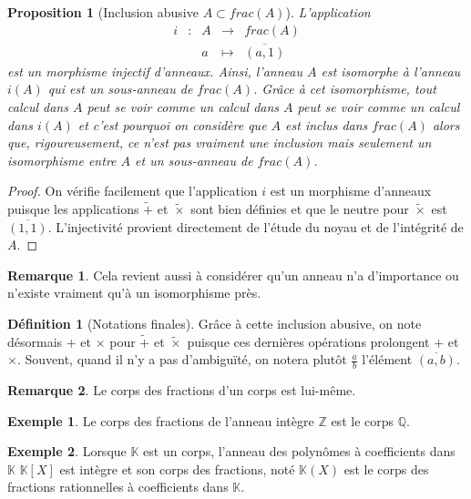 \documentclass[french]{book}
\newcommand{\Z}{\mathbb{Z}}
\newcommand{\Q}{\mathbb{Q}}
\newcommand{\K}{\mathbb{K}}
\theoremstyle{plain}
\newtheorem{prop}{Proposition}[chapter]
\theoremstyle{definition}
\newtheorem{dfn}{Définition}[chapter]
\newtheorem{exa}{Exemple}[chapter]
\newtheorem{rmq}{Remarque}[chapter]
\theoremstyle{remark}
\begin{document}
\begin{prop}[Inclusion abusive $A\subset frac(A)$]
	L'application $$\begin{array}{ccccc}i&:&A&\longrightarrow&frac(A)\\&&a&\longmapsto&\overline{(a,1)}\end{array}$$ est un morphisme injectif d'anneaux. Ainsi, l'anneau $A$ est isomorphe à l'anneau $i(A)$ qui est un sous-anneau de $frac(A)$. Grâce à cet isomorphisme, tout calcul dans $A$ peut se voir comme un calcul dans $A$ peut se voir comme un calcul dans $i(A)$ et c'est pourquoi on considère que $A$ est inclus dans $frac(A)$ alors que, rigoureusement, ce n'est pas vraiment une inclusion mais seulement un isomorphisme entre $A$ et un sous-anneau de $frac(A)$.
\end{prop}
\begin{proof}
	On vérifie facilement que l'application $i$ est un morphisme d'anneaux puisque les applications $\tilde{+}$ et $\tilde{\times}$ sont bien définies et que le neutre pour $\tilde{\times}$ est $\overline{(1,1)}$. L'injectivité provient directement de l'étude du noyau et de l'intégrité de $A$.
\end{proof}
\begin{rmq}
	Cela revient aussi à considérer qu'un anneau n'a d'importance ou n'existe vraiment qu'à un isomorphisme près.
\end{rmq}
\begin{dfn}[Notations finales]
	Grâce à cette inclusion abusive, on note désormais $+$ et $\times$ pour $\tilde{+}$ et $\tilde{\times}$ puisque ces dernières opérations prolongent $+$ et $\times$. Souvent, quand il n'y a pas d'ambiguïté, on notera plutôt $\displaystyle\frac{a}{b}$ l'élément $\overline{(a,b)}$.
\end{dfn}
\begin{rmq}
	Le corps des fractions d'un corps est lui-même.
\end{rmq}
\begin{exa}
	Le corps des fractions de l'anneau intègre $\Z$ est le corps $\Q$.
\end{exa}
\begin{exa}
	Lorsque $\K$ est un corps, l'anneau des polynômes à coefficients dans $\K$ $\K[X]$ est intègre et son corps des fractions, noté $\K(X)$ est le corps des fractions rationnelles à coefficients dans $\K$.
\end{exa}
\end{document}

